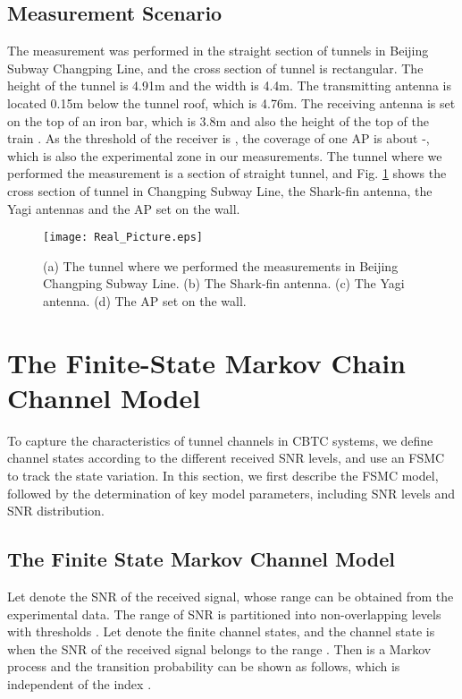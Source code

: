 \documentclass[conference]{IEEEtran}
\begin{document}
\subsection{Measurement Scenario}
The measurement was performed in the straight section of tunnels in Beijing Subway Changping Line, and the cross section of tunnel is rectangular. The height of the tunnel is 4.91m and the width is 4.4m. The transmitting antenna is located 0.15m below the tunnel roof, which is 4.76m. The receiving antenna is set on the top of an iron bar, which is 3.8m and also the height of the top of the train . As the threshold of the receiver is , the coverage of one AP is about -, which is also the experimental zone in our measurements. The tunnel where we performed the measurement is a section of straight tunnel, and Fig. \ref{RT} shows the cross section of tunnel in Changping Subway Line, the Shark-fin antenna, the Yagi antennas and the AP set on the wall.







\begin{figure}[tp]
\centering
\texttt{[image: Real\_Picture.eps]}
\caption{(a) The tunnel where we performed the measurements in Beijing Changping Subway Line. (b) The Shark-fin antenna. (c) The Yagi antenna. (d) The AP set on the wall.}
\label{RT}
\end{figure}








\section{The Finite-State Markov Chain Channel Model}
\label{Sec_FSMC}
To capture the characteristics of tunnel channels in CBTC systems, we define channel states according to the different received SNR levels, and use an FSMC to track the state variation. In this section, we first describe the FSMC model, followed by the determination of key model parameters, including  SNR levels and SNR distribution.

\subsection{The Finite State Markov Channel Model}
Let  denote the SNR of the received signal, whose range can be obtained from the experimental data. The range of SNR is partitioned into  non-overlapping levels with thresholds . Let  denote the finite channel states, and the channel state is  when the SNR of the received signal belongs to the range . Then  is a  Markov process and the transition probability  can be shown as follows, which is independent of the index .
\end{document}
